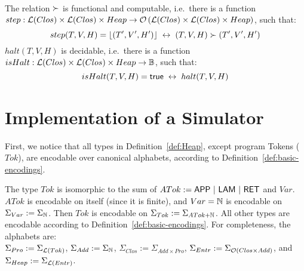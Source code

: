 \begin{lemma}
  \label{lem:heap-red}
  ~
  \begin{enumerate}
     \label{lem:step-iff}%
    The relation $\succ$ is functional and computable, i.e.\ there is a function
    $step : \mathcal{L}(Clos) \times \mathcal{L}(Clos) \times Heap \rightarrow \mathcal{O}\left(\mathcal{L}(Clos) \times \mathcal{L}(Clos) \times Heap\right)$, such that:
    \[
      step(T,V,H)=\left\lfloor {(T',V',H')} \right\rfloor ~\mathbin{\leftrightarrow}~ (T,V,H) \succ (T',V',H')
    \]
     \label{lem:halt_state_dec}%
    $halt(T,V,H)$ is decidable, i.e.\ there is a function $isHalt : \mathcal{L}(Clos) \times \mathcal{L}(Clos) \times Heap \rightarrow \mathbb{B}$, such that:
    \[
      isHalt(T,V,H) = \mathsf{true} ~\mathbin{\leftrightarrow}~ halt(T,V,H)
    \]
  \end{enumerate}
\end{lemma}


\section{Implementation of a Simulator}
\label{sec:heap-implementation}

First, we notice that all types in Definition~\ref{def:Heap}, except program Tokens ($Tok$), are encodable over canonical alphabets, according to
Definition~\ref{def:basic-encodings}.
%
\begin{definition}
  \label{def:Heap-encode}
  The type $Tok$ is isomorphic to the sum of $ATok := \mathsf{APP} ~|~ \mathsf{LAM} ~|~ \mathsf{RET}$ and $Var$.  $ATok$ is encodable on itself (since it is finite),
  and $Var = \mathbb{N}$ is encodable on $\Sigma_{Var} := \Sigma_{\mathbb{N}}$.  Then $Tok$ is encodable on $\Sigma_{Tok} := \Sigma_{ATok+\mathbb{N}}$.  All other types
  are encodable according to Definition~\ref{def:basic-encodings}.
  For completeness, the alphabets are:\\
  $\Sigma_{Pro} := \Sigma_{\mathcal{L}(Tok)}$, $\Sigma_{Add} := \Sigma_{\mathbb{N}}$, $\Sigma_{Clos}:=\Sigma_{Add \times Pro}$,
  $\Sigma_{Entr} := \Sigma_{\mathcal{O}(Clos \times Add)}$, and $\Sigma_{Heap} := \Sigma_{\mathcal{L}(Entr)}$.
\end{definition}

